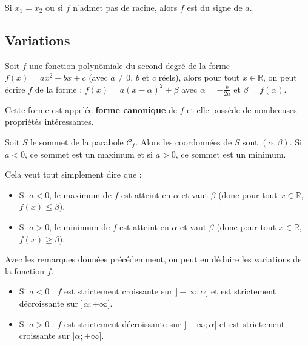 	\begin{tip}
		Si $x_1 = x_2$ ou si $f$ n'admet pas de racine, alors $f$ est du signe de $a$.
	\end{tip}
	
	\subsection{Variations}
	\label{variations}
	
	\begin{formula}
		Soit $f$ une fonction polynômiale du second degré de la forme $f(x) = ax^2 + bx +c$ (avec $a \neq 0$, $b$ et $c$ réels), alors pour tout $x \in \mathbb{R}$, on peut écrire $f$ de la forme :
		\newpar
		$f(x) = a(x - \alpha)^2 + \beta$ avec $\alpha = -\frac{b}{2a}$ et $\beta = f(\alpha)$.
	\end{formula}
	
	Cette forme est appelée \textbf{forme canonique} de $f$ et elle possède de nombreuses propriétés intéressantes.
	
	\begin{formula}
		Soit $S$ le sommet de la parabole $\mathcal{C}_f$. Alors les coordonnées de $S$ sont $(\alpha, \beta)$.
		\newline
		Si $a < 0$, ce sommet est un maximum et si $a > 0$, ce sommet est un minimum.
	\end{formula}
	
	\begin{tip}
		Cela veut tout simplement dire que :
		\begin{itemize}
			\item Si $a < 0$, le maximum de $f$ est atteint en $\alpha$ et vaut $\beta$ (donc pour tout $x \in \mathbb{R}$, $f(x) \leq \beta$).
			\item Si $a > 0$, le minimum de $f$ est atteint en $\alpha$ et vaut $\beta$ (donc pour tout $x \in \mathbb{R}$, $f(x) \geq \beta$).
		\end{itemize}
	\end{tip}
	
	Avec les remarques données précédemment, on peut en déduire les variations de la fonction $f$.
	
	\begin{formula}
		\entretitreetliste
		\begin{itemize}
			\item Si $a < 0$ : $f$ est strictement croissante sur $]-\infty; \alpha]$ et est strictement décroissante sur $]\alpha; +\infty]$.
			\item Si $a > 0$ : $f$ est strictement décroissante sur $]-\infty; \alpha]$ et est strictement croissante sur $]\alpha; +\infty]$.
		\end{itemize}
	\end{formula}
	
